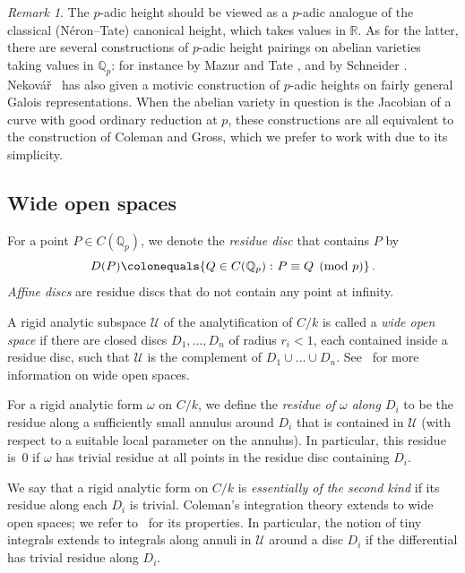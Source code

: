 \documentclass[11pt, a4paper]{amsart}
\newcommand{\R}{\mathbb{R}}
\newcommand{\Q}{\mathbb{Q}}
\newcommand{\calU}{\mathcal{U}}
\theoremstyle{remark}
\newtheorem{remark}[theorem]{Remark}
\numberwithin{equation}{section}
\newcommand{\sm}{{}}
\begin{document}
\begin{remark}\label{R:other_heights}
  The $p$-adic height should be viewed as a $p$-adic analogue of the 
classical (N\'eron--Tate) canonical height, which
takes values in $\R$. As for the latter, there 
are several constructions of $p$-adic height pairings on abelian varieties taking values
in $\Q_p$: for instance by Mazur and Tate \cite{Mazur-Tate-p-adic-heights}, and by Schneider
\cite{Schneider-p-adic-heights1}.
  Nekov\'{a}\v{r}~\cite{Nek93} has also given a motivic construction of
  $p$-adic heights
  on fairly general Galois representations. When the abelian
variety in question is the Jacobian of a curve with good ordinary reduction at $p$,
  these constructions are all equivalent to the construction of Coleman and
  Gross,
  which we prefer to work with due to its simplicity. 
  \end{remark}

  \subsection{Wide open spaces}\label{subsec:}
\sm{
For a point $P\in C(\Q_p)$, we denote 
the \textit{residue disc} that contains $P$ by 
\begin{equation}\label{res_disc}
D(P)\colonequals\{Q\in C(\Q_p)\,\colon  P\equiv Q\pmod{p}\}\,.
\end{equation}
\textit{Affine discs} are residue discs that do not contain any point at infinity.

  A rigid analytic subspace $\calU$ of the analytification of $C/k$ is called a
  \textit{wide open space} if there are closed discs $D_1,\ldots,D_n$ of radius
  $r_i<1$, each
  contained inside a residue disc, such that $\calU$ is the complement of
  $D_1\cup\ldots\cup D_n$. See~\cite[Section~2]{Besser-Syntomic-2} for more
  information on wide open spaces.

  For a rigid analytic form $\omega$ on $C/k$, we define the
  \textit{residue of $\omega$ along $D_i$} to be the residue along a
  sufficiently small 
  annulus around $D_i$ that is contained in $\calU$ (with respect to a
  suitable local parameter on the annulus). In particular, this
  residue is~0 if $\omega$ 
  has trivial residue at all points in the residue disc containing $D_i$.

  We say that a rigid analytic form on $C/k$
  is \textit{essentially of the second kind} if its residue along each
  $D_i$ is trivial.
  Coleman's integration theory extends to wide open spaces; we refer
  to~\cite[Theorem~4.1]{BBHeights} for its properties. 
  In particular, the
  notion of tiny integrals extends to integrals along annuli in $\calU$
  around a disc $D_i$ if the differential has trivial residue along $D_i$.
}
\end{document}
